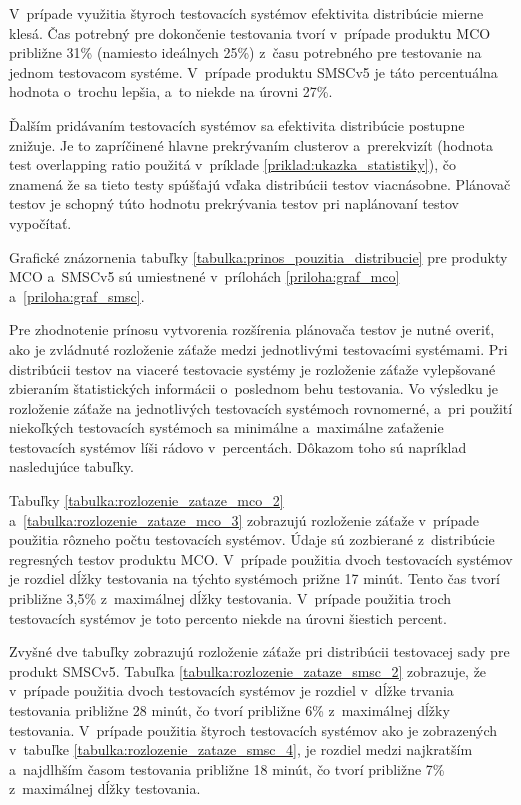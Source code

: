 V~prípade využitia štyroch testovacích systémov efektivita distribúcie 
mierne klesá. Čas potrebný pre dokončenie testovania tvorí 
v~prípade produktu MCO približne 31\% (namiesto ideálnych 25\%) 
z~času potrebného pre testovanie na jednom testovacom systéme.
V~prípade produktu SMSCv5 je táto percentuálna hodnota o~trochu 
lepšia, a~to niekde na úrovni 27\%.

Ďalším pridávaním testovacích systémov sa efektivita distribúcie 
postupne znižuje. Je to zapríčinené hlavne prekrývaním clusterov 
a~prerekvizít (hodnota test overlapping ratio použitá v~príklade 
\ref{priklad:ukazka_statistiky}), čo znamená že sa tieto testy spúšťajú 
vďaka distribúcii testov viacnásobne. Plánovač testov je schopný túto 
hodnotu prekrývania testov pri naplánovaní testov vypočítať.

Grafické znázornenia tabuľky \ref{tabulka:prinos_pouzitia_distribucie}
pre produkty MCO a~SMSCv5 sú umiestnené v~prílohách 
\ref{priloha:graf_mco} a~\ref{priloha:graf_smsc}.

Pre zhodnotenie prínosu vytvorenia rozšírenia plánovača testov je nutné
overiť, ako je zvládnuté rozloženie záťaže medzi jednotlivými testovacími
systémami. Pri distribúcii testov na viaceré testovacie systémy je 
rozloženie záťaže vylepšované zbieraním štatistických informácii o~poslednom
behu testovania. 
Vo výsledku je rozloženie záťaže na jednotlivých testovacích systémoch
rovnomerné, a~pri použití niekoľkých testovacích systémoch sa 
minimálne a~maximálne zaťaženie testovacích systémov líši rádovo v~percentách.
Dôkazom toho sú napríklad nasledujúce tabuľky. 

Tabuľky \ref{tabulka:rozlozenie_zataze_mco_2} a~\ref{tabulka:rozlozenie_zataze_mco_3} 
zobrazujú rozloženie záťaže v~prípade
použitia rôzneho počtu testovacích systémov. Údaje sú zozbierané
z~distribúcie regresných testov produktu MCO. V~prípade použitia
dvoch testovacích systémov je rozdiel dĺžky testovania na týchto systémoch
prižne 17 minút. Tento čas tvorí približne 3,5\% z~maximálnej dĺžky testovania.
V~prípade použitia troch testovacích systémov je toto percento niekde 
na úrovni šiestich percent.
 
Zvyšné dve tabuľky zobrazujú rozloženie záťaže pri distribúcii testovacej
sady pre produkt SMSCv5. Tabuľka \ref{tabulka:rozlozenie_zataze_smsc_2} 
zobrazuje, že v~prípade použitia dvoch testovacích systémov je rozdiel
v~dĺžke trvania testovania približne 28 minút, čo tvorí približne 6\%
z~maximálnej dĺžky testovania. V~prípade použitia štyroch
testovacích systémov ako je zobrazených v~tabuľke \ref{tabulka:rozlozenie_zataze_smsc_4},
je rozdiel medzi najkratším a~najdlhším časom testovania približne 18 minút, čo
tvorí približne 7\% z~maximálnej dĺžky testovania.



